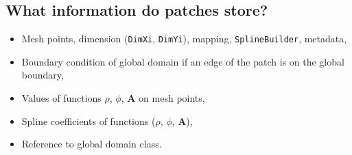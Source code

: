 \documentclass[presentation.tex]{subfiles}
\begin{document}
\subsection{What information do patches store?}
\begin{itemize}
    \item Mesh points, dimension (\texttt{DimXi}, \texttt{DimYi}), mapping,
            \texttt{SplineBuilder}, metadata, 
    \item Boundary condition of global domain if an edge of the patch is on the global boundary,
    \item Values of functions $\rho$, $\phi$, $\mathbf{A}$ on mesh points,
    \item Spline coefficients of functions ($\rho$, $\phi$, $\mathbf{A}$),
    \item Reference to global domain class.
\end{itemize}
\end{document}
